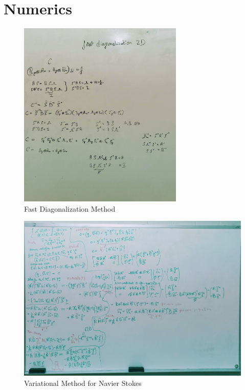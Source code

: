 \chapter{Numerics}
\begin{figure}[h!]
    \centering
    \includegraphics[width=0.7\textwidth]{fig/FDM.jpg}
    \caption{Fast Diagonalization Method}
    \label{fig:rtt}
\end{figure}

\begin{figure}[h!]
    \centering
    \includegraphics[width=1.0\textwidth]{fig/varNS.jpg}
    \caption{Variational Method for Navier Stokes}
    \label{fig:rtt}
\end{figure}

